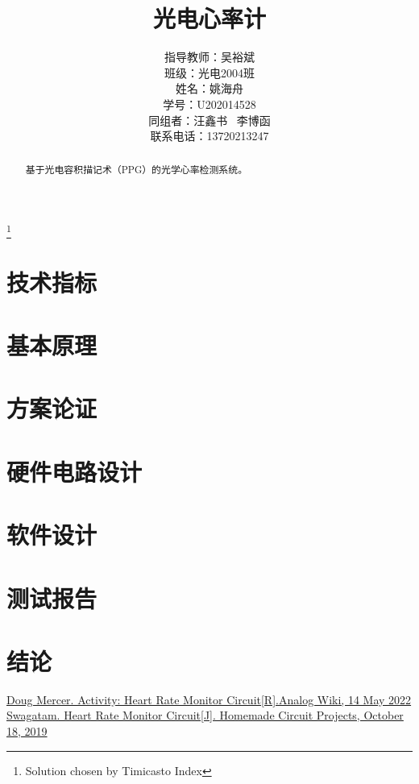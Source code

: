 \documentclass[a4paper]{ctexart}
\title{光电心率计}
\author{指导教师：吴裕斌 \\ 班级：光电2004班\\姓名：姚海舟\\学号：U202014528\\同组者：汪鑫书 \ 李博函\\联系电话：13720213247}
\begin{document}
\maketitle
\thanks{Solution chosen by Timicasto Index}
\newpage
\tableofcontents

\newpage
\begin{abstract}
	基于光电容积描记术（PPG）的光学心率检测系统。
\end{abstract}


\newpage
\section{技术指标}

\newpage
\section{基本原理}

\newpage
\section{方案论证}

\newpage
\section{硬件电路设计}
\cite{Activity:HRM Circuit}
\cite{HRM Circuit}
\newpage
\section{软件设计}

\newpage
\section{测试报告}

\newpage
\section{结论}

\newpage
\begin{thebibliography}{20}
	\href{https://wiki.analog.com/university/courses/alm1k/alm-lab-heart-rate-mon}{Doug Mercer. Activity: Heart Rate Monitor Circuit[R].Analog Wiki, 14 May 2022}
	\href{https://www.homemade-circuits.com/heart-rate-monitor-alarm-circuit/}{Swagatam. Heart Rate Monitor Circuit[J]. Homemade Circuit Projects, October 18, 2019}
\end{thebibliography}
\end{document}
